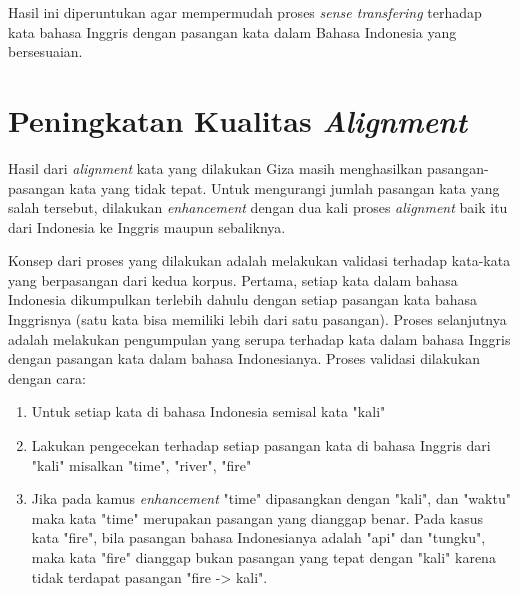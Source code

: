 Hasil ini diperuntukan agar mempermudah proses \textit{sense transfering} terhadap kata bahasa Inggris dengan pasangan kata dalam Bahasa Indonesia yang bersesuaian. 

\section{Peningkatan Kualitas \textit{Alignment}}

Hasil dari \textit{alignment} kata yang dilakukan Giza masih menghasilkan pasangan-pasangan kata yang tidak tepat. Untuk mengurangi jumlah pasangan kata yang salah tersebut, dilakukan \textit{enhancement} dengan dua kali proses \textit{alignment} baik itu dari Indonesia ke Inggris maupun sebaliknya.

Konsep dari proses yang dilakukan adalah melakukan validasi terhadap kata-kata yang berpasangan  dari kedua korpus. Pertama, setiap kata dalam bahasa Indonesia dikumpulkan terlebih dahulu dengan setiap pasangan kata bahasa Inggrisnya (satu kata bisa memiliki lebih dari satu pasangan). Proses selanjutnya adalah melakukan pengumpulan yang serupa terhadap kata dalam bahasa Inggris dengan pasangan kata dalam bahasa Indonesianya. Proses validasi dilakukan dengan cara:

\begin{enumerate}
	\item Untuk setiap kata di bahasa Indonesia semisal kata "kali"
	\item Lakukan pengecekan terhadap setiap pasangan kata di bahasa Inggris dari "kali" misalkan "time", "river", "fire"
	\item Jika pada kamus \textit{enhancement} "time" dipasangkan dengan "kali", dan "waktu" maka kata "time" merupakan pasangan yang dianggap benar. Pada kasus kata "fire", bila pasangan bahasa Indonesianya adalah "api" dan "tungku", maka kata "fire" dianggap bukan pasangan yang tepat dengan "kali" karena tidak terdapat pasangan "fire -> kali".
\end{enumerate} 

